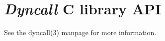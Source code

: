 %
%
%
%

\clearpage
\section{\emph{Dyncall} C library API}

See the dyncall(3) manpage for more information.


